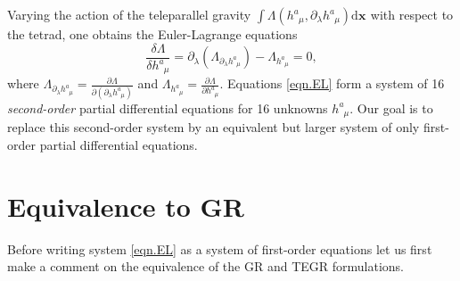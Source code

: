 \documentclass[
10pt, %
a4paper, %
oneside, %
twocolumn,
headinclude,footinclude, %
BCOR5mm, %
]{scrartcl}
\newcommand{\pd}[1]{\partial_{#1}}
\newcommand{\dx}[1]{{\bm{\mathrm{d}x}^{#1}}}
\newcommand{\tetrsymbol}{h}
\newcommand{\tetr}[2]{\tetrsymbol^{#1}_{\phantom{#1}#2}}
\newcommand{\Lag}{\Lambda}	%
\begin{document}
	Varying the action of the teleparallel gravity $ \int 
	\Lag(\tetr{a}{\mu},\pd{\lambda}\tetr{a}{\mu}) 
	\bm{\dx{}}$ 
	with respect to 
	the tetrad, one obtains the Euler-Lagrange equations 
	\begin{equation}\label{eqn.EL}
		\frac{\delta \Lambda}{\delta\tetr{a}{\mu}} = \pd{\lambda}(\Lag_{\pd{\lambda}\tetr{a}{\mu}}) 
		- 
		\Lag_{\tetr{a}{\mu}} = 0,
	\end{equation}
	where $ \Lag_{\pd{\lambda}\tetr{a}{\mu}} = \frac{\partial 
		\Lag}{\partial(\pd{\lambda}\tetr{a}{\mu})} $ and $ 
	\Lag_{\tetr{a}{\mu}} = \frac{\partial \Lag}{\partial\tetr{a}{\mu}} $. Equations \eqref{eqn.EL} 
	form a system of 16 \emph{second-order} partial differential equations for 
	16 unknowns $ \tetr{a}{\mu} $. Our goal is to replace this second-order system by an equivalent 
	but 
	larger system of only first-order partial differential equations.
	
	\section{Equivalence to GR}
	
	Before writing system \eqref{eqn.EL} as a system of first-order equations let us first make a 
	comment on the equivalence of the GR and TEGR formulations. 
	
\end{document}
